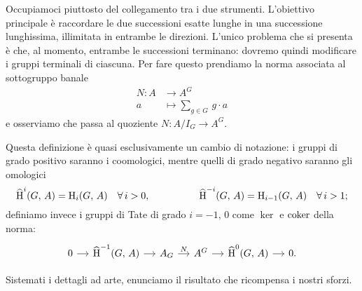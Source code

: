 Occupiamoci piuttosto del collegamento tra i due strumenti. L'obiettivo principale è raccordare le due successioni esatte lunghe in una successione lunghissima, illimitata in entrambe le direzioni. L'unico problema che si presenta è che, al momento, entrambe le successioni terminano: dovremo quindi modificare i gruppi terminali di ciascuna. Per fare questo prendiamo la norma associata al sottogruppo banale
\begin{align*}
N \colon A  & \to A^G \\
a & \mapsto \sum_{g \in G} \, g \cdot a
\end{align*}
e osserviamo che passa al quoziente $ N \colon A/I_G \to A^G $. 

\begin{definition}
	Questa definizione è quasi esclusivamente un cambio di notazione: i gruppi di grado positivo saranno i coomologici, mentre quelli di grado negativo saranno gli omologici
	\[ \operatorname{\widehat{H}}^i(G, \, A) = \operatorname{H}_i(G, \, A) \quad \forall\, i > 0, \qquad\quad\qquad \operatorname{\widehat{H}}^{-i}(G, \, A) = \operatorname{H}_{i-1}(G, \, A) \quad \forall\, i > 1;
	 \]
	 definiamo invece i gruppi di Tate di grado $ i = -1, \, 0 $ come $ \ker $ e $ \operatorname{coker} $ della norma:
	 \begin{equation}\label{tatedef}
	 	\begin{tikzcd}[column sep = small]
	 	0 \rar& \Hhh^{-1}(G, \, A) \rar& A_G \rar["N"]& A^G \rar&\Hhh^0(G, \, A) \rar& 0.
	 	\end{tikzcd}
	 \end{equation}
\end{definition}

Sistemati i dettagli ad arte, enunciamo il risultato che ricompensa i nostri sforzi.

